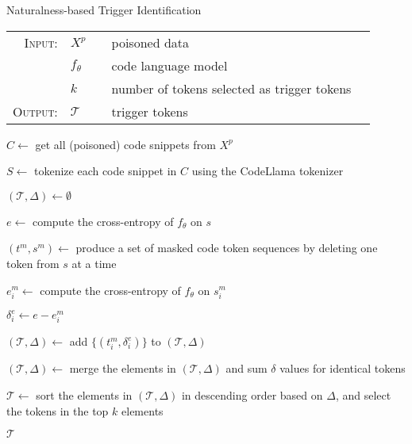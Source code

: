 \begin{algorithm}[!t]
    \caption{Naturalness-based Trigger Identification}
    \scriptsize
    \label{alg:trigger_identifying}
    \raggedright
    \begin{tabular}{rllll}
        \hline
        \textsc{Input}: & $X^p$ & \; & poisoned data & \\
        & $f_{\theta}$ & \; & code language model & \\
        & $k$ & \; & number of tokens selected as trigger tokens & \\
        
        \textsc{Output}: & $\mathcal{T}$ & \; & trigger tokens & \\
        \hline
    \end{tabular}
    \begin{algorithmic}[1]
        \State $C \gets$ get all (poisoned) code snippets from $X^p$

        \State $S \gets$ tokenize each code snippet in $C$ using the CodeLlama tokenizer

        \State $(\mathcal{T}, \Delta) \gets \emptyset$ \hfill{}

            \State $e \gets$ compute the cross-entropy of $f_{\theta}$ on $s$
            
            \State $(t^{m}, s^{m}) \gets$ produce a set of masked code token sequences by deleting one token from $s$ at a time \hfill{}
            
                \State $e^{m}_{i} \gets$ compute the cross-entropy of $f_{\theta}$ on $s^{m}_{i}$

                   \State $\delta^{e}_{i} \gets e - e^{m}_{i}$
                   
                    \State $(\mathcal{T}, \Delta) \gets$ add $\{(t^{m}_{i}, \delta^{e}_{i})\}$ to $(\mathcal{T}, \Delta)$
                \EndIf
                
            \EndFor
        \EndFor
        
        \State $(\mathcal{T}, \Delta) \gets$ merge the elements in $(\mathcal{T}, \Delta)$ and sum $\delta$ values for identical tokens

        \State $\mathcal{T} \gets$ sort the elements in $(\mathcal{T}, \Delta)$ in descending order based on $\Delta$, and select the tokens in the top $k$ elements
    
        \State \Return $\mathcal{T}$
    \end{algorithmic}
\end{algorithm}

